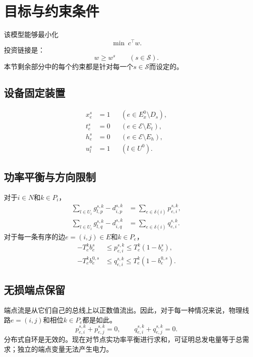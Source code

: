 \documentclass[11pt]{article}
\begin{document}
\section{目标与约束条件}
该模型能够最小化
\[
\min\ c^\top w.
\]
投资链接是：
\[
w\geq w^s\qquad(s\in\mathcal S).
\]
本节剩余部分中的每个约束都是针对每一个$s\in\mathcal S$而设定的。

\subsection{设备固定装置}
\begin{align*}
x_e^s&=1 &&(e\in E_x^0\setminus D_s),\\
t_e^s&=0 &&(e\in\mathcal E\setminus E_t),\\
h_e^s&=0 &&(e\in\mathcal E\setminus E_h),\\
u_l^s&=1 &&(l\in U^0).
\end{align*}

\subsection{功率平衡与方向限制}
对于$i\in N$和$k\in P_i$，
\begin{align*}
\sum_{l\in U_i}g_{l,p}^{s,k}-d_{i,p}^{s,k}
 &=\sum_{e\in\delta(i)}p_{e,i}^{s,k},\\
\sum_{l\in U_i}g_{l,q}^{s,k}-d_{i,q}^{s,k}
 &=\sum_{e\in\delta(i)}q_{e,i}^{s,k}.
\end{align*}
对于每一条有序的边$e=(i,j)\in E$和$k\in P_e$，
\begin{align*}
-T_e^k b_e^s&\leq p_{e,i}^{s,k}\leq T_e^k(1-b_e^s),\\
-T_e^k b_e^{0,s}&\leq q_{e,i}^{s,k}\leq T_e^k(1-b_e^{0,s}).
\end{align*}

\subsection{无损端点保留}
端点流是从它们自己的总线上以正数值流出。因此，对于每一种情况来说，物理线路$e=(i,j)$和相位$k\in P_e$都是如此。
\[
 p_{e,i}^{s,k}+p_{e,j}^{s,k}=0,\qquad
 q_{e,i}^{s,k}+q_{e,j}^{s,k}=0.
\]
分布式自环是无效的。现在对节点实功率平衡进行求和，可证明总发电量等于总需求；独立的端点变量无法产生电力。
\end{document}
